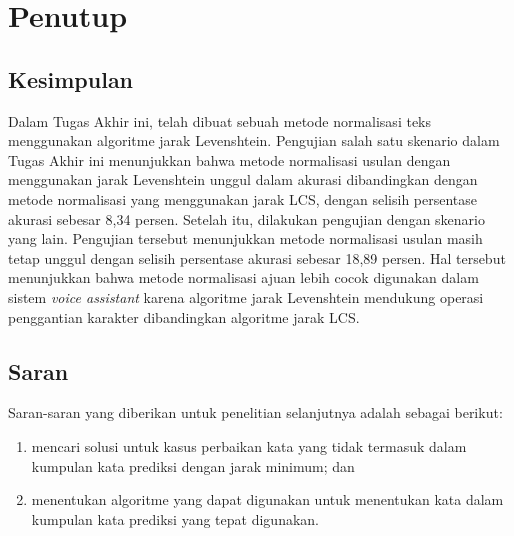 \chapter{Penutup}

\section{Kesimpulan}

Dalam Tugas Akhir ini, telah dibuat sebuah metode normalisasi teks menggunakan algoritme jarak Levenshtein. Pengujian salah satu skenario dalam Tugas Akhir ini menunjukkan bahwa metode normalisasi usulan dengan menggunakan jarak Levenshtein unggul dalam akurasi dibandingkan dengan metode normalisasi \parencite{saragih2017normalisasi} yang menggunakan jarak LCS, dengan selisih persentase akurasi sebesar 8,34 persen. Setelah itu, dilakukan pengujian dengan skenario yang lain. Pengujian tersebut menunjukkan metode normalisasi usulan masih tetap unggul dengan selisih persentase akurasi sebesar 18,89 persen. Hal tersebut menunjukkan bahwa metode normalisasi ajuan lebih cocok digunakan dalam sistem \textit{voice assistant} karena algoritme jarak Levenshtein mendukung operasi penggantian karakter dibandingkan algoritme jarak LCS.

\section{Saran}

Saran-saran yang diberikan untuk penelitian selanjutnya adalah sebagai berikut:
\begin{enumerate}
    \item mencari solusi untuk kasus perbaikan kata yang tidak termasuk dalam kumpulan kata prediksi dengan jarak minimum; dan
    \item menentukan algoritme yang dapat digunakan untuk menentukan kata dalam kumpulan kata prediksi yang tepat digunakan.
\end{enumerate}